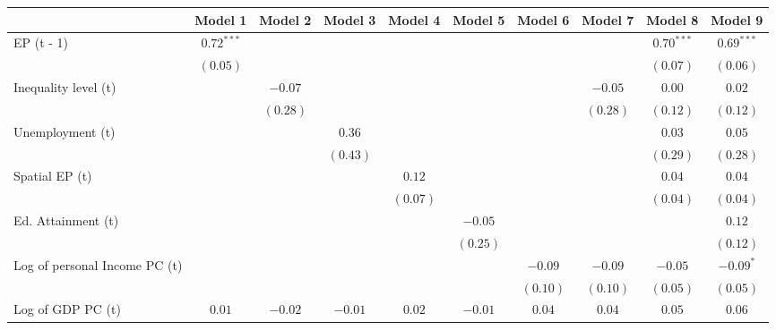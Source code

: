
\begin{table}
\begin{center}
\begin{tabular}{l c c c c c c c c c}
\hline
 & Model 1 & Model 2 & Model 3 & Model 4 & Model 5 & Model 6 & Model 7 & Model 8 & Model 9 \\
\hline
EP (t - 1)                    & $0.72^{***}$ &          &          &          &          &          &          & $0.70^{***}$ & $0.69^{***}$ \\
                              & $(0.05)$     &          &          &          &          &          &          & $(0.07)$     & $(0.06)$     \\
Inequality level (t)          &              & $-0.07$  &          &          &          &          & $-0.05$  & $0.00$       & $0.02$       \\
                              &              & $(0.28)$ &          &          &          &          & $(0.28)$ & $(0.12)$     & $(0.12)$     \\
Unemployment (t)              &              &          & $0.36$   &          &          &          &          & $0.03$       & $0.05$       \\
                              &              &          & $(0.43)$ &          &          &          &          & $(0.29)$     & $(0.28)$     \\
Spatial EP (t)                &              &          &          & $0.12$   &          &          &          & $0.04$       & $0.04$       \\
                              &              &          &          & $(0.07)$ &          &          &          & $(0.04)$     & $(0.04)$     \\
Ed. Attainment (t)            &              &          &          &          & $-0.05$  &          &          &              & $0.12$       \\
                              &              &          &          &          & $(0.25)$ &          &          &              & $(0.12)$     \\
Log of personal Income PC (t) &              &          &          &          &          & $-0.09$  & $-0.09$  & $-0.05$      & $-0.09^{*}$  \\
                              &              &          &          &          &          & $(0.10)$ & $(0.10)$ & $(0.05)$     & $(0.05)$     \\
Log of GDP PC (t)             & $0.01$       & $-0.02$  & $-0.01$  & $0.02$   & $-0.01$  & $0.04$   & $0.04$   & $0.05$       & $0.06$       \\

\end{tabular}
\end{center}
\end{table}

